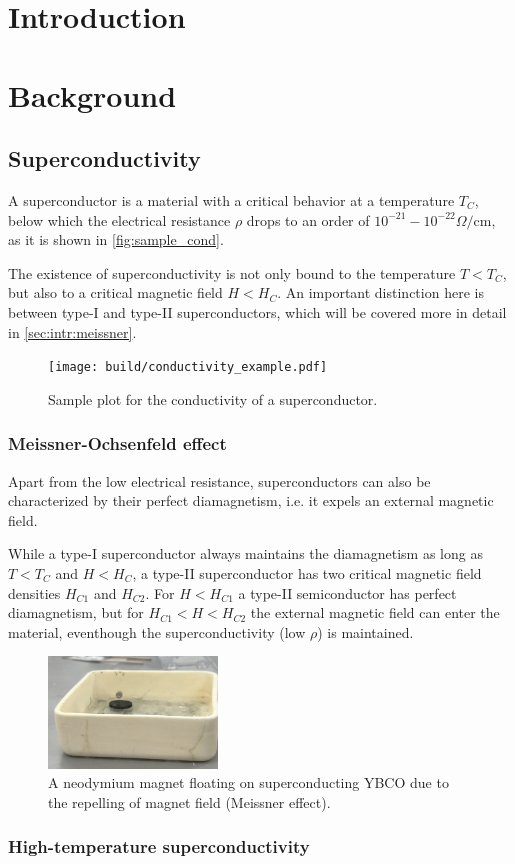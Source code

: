 \section{Introduction}
\label{sec:introduction}

\section{Background}
\label{sec:Background}

\subsection{Superconductivity}
\label{sec:Superconductivity}
A superconductor is a material with a critical behavior at a temperature $T_C$, below which the
electrical resistance $\rho$ drops to an order of $10^{-21} - 10^{-22} \Omega / \text{cm}$, as it is shown
in \autoref{fig:sample_cond}. 

The existence of superconductivity is not only bound to the temperature $T<T_C$, but also to a
critical magnetic field $H < H_C$. An important distinction here is between type-I and type-II
superconductors, which will be covered more in detail in \autoref{sec:intr:meissner}.

\begin{figure}
  \centering
  \texttt{[image: build/conductivity\_example.pdf]}
  \caption{Sample plot for the conductivity of a superconductor.}
  \label{fig:sample_cond}
\end{figure}

\subsubsection{Meissner-Ochsenfeld effect}
\label{sec:intr:meissner}
Apart from the low electrical resistance, superconductors can also be characterized by their perfect
diamagnetism, i.e. it expels an external magnetic field. 

While a type-I superconductor always maintains the diamagnetism as long as $T < T_C$ and $H < H_C$, a type-II
superconductor has two critical magnetic field densities $H_{C1}$ and $H_{C2}$. For $H < H_{C1}$ a
type-II semiconductor has perfect diamagnetism, but for $H_{C1} < H < H_{C2}$ the external magnetic
field can enter the material, eventhough the superconductivity (low $\rho$) is
maintained.

\begin{figure}
  \centering
  \includegraphics[width=0.4\textwidth]{media/meissner.jpg}
  \caption{A neodymium magnet floating on superconducting YBCO due to the repelling of magnet field
  (Meissner effect).}
  \label{fig:sample_cond}
\end{figure}

\subsubsection{High-temperature superconductivity}
\label{sec:intr:high-tc}

